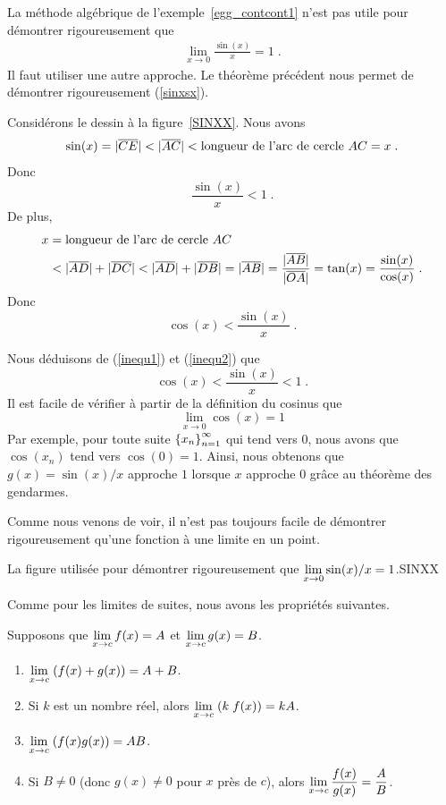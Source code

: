 {\begin{egg}[\theory]
La méthode algébrique de l'exemple~\ref{egg_contcont1} n'est pas utile
pour démontrer rigoureusement que
\begin{align} \label{sinxsx}
\lim_{x\rightarrow 0} \frac{\sin(x)}{x} = 1 \; .
\end{align}
Il faut utiliser une autre approche.  Le théorème précédent nous
permet de démontrer rigoureusement (\ref{sinxsx}).

Considérons le dessin à la figure~\ref{SINXX}.  Nous avons
\[
\sin(x) = |\overline{CE}| < |\overline{AC}|
< \text{longueur de l'arc de cercle}\ AC = x \; .
\]
Donc
\begin{equation}\label{inequ1}
\frac{\sin(x)}{x} < 1 \; .
\end{equation}
De plus,
\begin{align*}
x &= \text{longueur de l'arc de cercle}\ AC \\
&< |\overline{AD}| + |\overline{DC}| < |\overline{AD}| + |\overline{DB}|
= |\overline{AB}| = \frac{|\overline{AB}|}{|\overline{OA}|}
= \tan(x) = \frac{\sin(x)}{\cos(x)} \; .
\end{align*}
Donc
\begin{equation}\label{inequ2}
\cos(x) < \frac{\sin(x)}{x} \; .
\end{equation}

Nous déduisons de (\ref{inequ1}) et (\ref{inequ2}) que
\[
\cos(x) < \frac{\sin(x)}{x} < 1  \; .
\]
Il est facile de vérifier à partir de la définition du cosinus que
\[
\lim_{x\rightarrow 0} \cos(x) = 1
\]
Par exemple, pour toute suite
$\displaystyle \left\{x_n\right\}_{n=1}^\infty$ qui tend vers $0$,
nous avons que $\cos(x_n)$ tend vers $\cos(0) = 1$. Ainsi, nous
obtenons que
$g(x) = \sin(x)/x$ approche $1$ lorsque $x$ approche $0$ grâce au
théorème des gendarmes.
\label{R_SINXX}
\end{egg}

Comme nous venons de voir, il n'est pas toujours facile de démontrer
rigoureusement qu'une fonction à une limite en un point.

{La figure utilisée pour démontrer rigoureusement que
$\displaystyle \lim_{x\rightarrow 0} \sin(x)/x = 1$.}{SINXX}

Comme pour les limites de suites, nous avons les propriétés suivantes.

\begin{theorem} \label{lim_funct_scd}
Supposons que $\displaystyle \lim_{x\rightarrow c} f(x) = A$ et
$\displaystyle \lim_{x\rightarrow c} g(x) = B$.
\begin{enumerate}
\item $\displaystyle \lim_{x\rightarrow c}\; (f(x) + g(x) ) = A + B$.
\item Si $k$ est un nombre réel, alors
$\displaystyle \lim_{x\rightarrow c}\; (k\; f(x)) = kA$.
\item $\displaystyle \lim_{x\rightarrow c}\; (f(x)g(x)) = AB$.
\item Si $B \neq 0$ (donc $g(x) \neq 0$ pour $x$ près de $c$),
alors $\displaystyle \lim_{x\rightarrow c} \frac{f(x)}{g(x)} = \frac{A}{B}$.
\end{enumerate}
\end{theorem}

}
